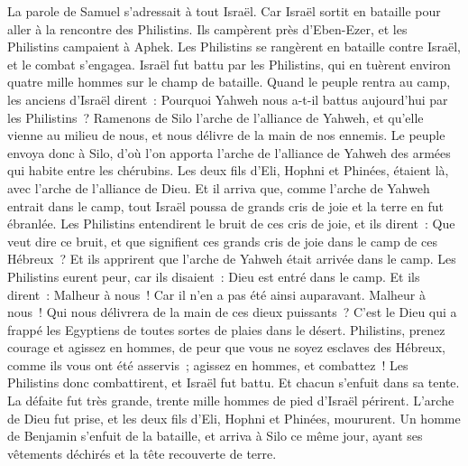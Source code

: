 \begin{multicols}{2}
\VerseOne{}La parole de Samuel s'adressait à tout Israël. Car Israël sortit en bataille pour aller à la rencontre des Philistins. Ils campèrent près d'Eben-Ezer, et les Philistins campaient à Aphek.
Les Philistins se rangèrent en bataille contre Israël, et le combat s'engagea. Israël fut battu par les Philistins, qui en tuèrent environ quatre mille hommes sur le champ de bataille.
Quand le peuple rentra au camp, les anciens d'Israël dirent~: Pourquoi Yahweh nous a-t-il battus aujourd'hui par les Philistins~? Ramenons de Silo l'arche de l'alliance de Yahweh, et qu'elle vienne au milieu de nous, et nous délivre de la main de nos ennemis.
Le peuple envoya donc à Silo, d'où l'on apporta l'arche de l'alliance de Yahweh des armées qui habite entre les chérubins. Les deux fils d'Eli, Hophni et Phinées, étaient là, avec l'arche de l'alliance de Dieu.
Et il arriva que, comme l'arche de Yahweh entrait dans le camp, tout Israël poussa de grands cris de joie et la terre en fut ébranlée.
Les Philistins entendirent le bruit de ces cris de joie, et ils dirent~: Que veut dire ce bruit, et que signifient ces grands cris de joie dans le camp de ces Hébreux~? Et ils apprirent que l'arche de Yahweh était arrivée dans le camp.
Les Philistins eurent peur, car ils disaient~: Dieu est entré dans le camp. Et ils dirent~: Malheur à nous~! Car il n'en a pas été ainsi auparavant.
Malheur à nous~! Qui nous délivrera de la main de ces dieux puissants~? C'est le Dieu qui a frappé les Egyptiens de toutes sortes de plaies dans le désert.
Philistins, prenez courage et agissez en hommes, de peur que vous ne soyez esclaves des Hébreux, comme ils vous ont été asservis~; agissez en hommes, et combattez~!
Les Philistins donc combattirent, et Israël fut battu. Et chacun s'enfuit dans sa tente. La défaite fut très grande, trente mille hommes de pied d'Israël périrent.
L'arche de Dieu fut prise, et les deux fils d'Eli, Hophni et Phinées, moururent.
Un homme de Benjamin s'enfuit de la bataille, et arriva à Silo ce même jour, ayant ses vêtements déchirés et la tête recouverte de terre.

\end{multicols}
